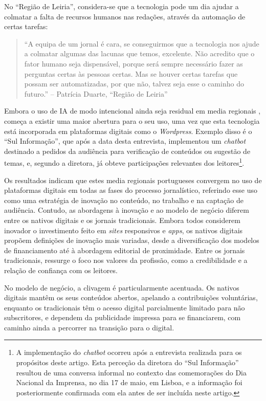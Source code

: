 \documentclass[portuguese]{textolivre}
\begin{document}
No ``Região de Leiria'', considera-se que a tecnologia pode um dia
ajudar a colmatar a falta de recursos humanos nas redações, através da
automação de certas tarefas:

\begin{quote}
``A equipa de um jornal é cara, se conseguirmos que a tecnologia nos
ajude a colmatar algumas das lacunas que temos, excelente. Não acredito
que o fator humano seja dispensável, porque será sempre necessário fazer
as perguntas certas às pessoas certas. Mas se houver certas tarefas que
possam ser automatizadas, por que não, talvez seja esse o caminho do
futuro.'' -- Patrícia Duarte, ``Região de Leiria''
\end{quote}

Embora o uso de IA de modo intencional ainda seja residual em media
regionais \cite{Goncalves2024}, começa a existir uma maior abertura
para o seu uso, uma vez que esta tecnologia está incorporada em
plataformas digitais como o \emph{Wordpress}. Exemplo disso é o ``Sul
Informação'', que após a data desta entrevista, implementou um
\emph{chatbot }destinado a pedidos da audiência para verificação de
conteúdos ou sugestão de temas, e, segundo a diretora, já obteve
participações relevantes dos leitores\footnote{A
  implementação do \emph{chatbot} ocorreu após a entrevista realizada
  para os propósitos deste artigo. Esta perceção da diretora do ``Sul
  Informação'' resultou de uma conversa informal no contexto das
  comemorações do Dia Nacional da Imprensa, no dia 17 de maio, em
  Lisboa, e a informação foi posteriormente confirmada com ela antes de
  ser incluída neste artigo.}.

Os resultados indicam que estes media regionais portugueses convergem no
uso de plataformas digitais em todas as fases do processo jornalístico,
referindo esse uso como uma estratégia de inovação no conteúdo, no
trabalho e na captação de audiência. Contudo, as abordagens à inovação e
ao modelo de negócio diferem entre os nativos digitais e os jornais
tradicionais. Embora todos considerem inovador o investimento feito em
\emph{sites} responsivos e \emph{apps}, os nativos digitais propõem
definições de inovação mais variadas, desde a diversificação dos modelos
de financiamento até à abordagem editorial de proximidade. Entre os
jornais tradicionais, ressurge o foco nos valores da profissão, como a
credibilidade e a relação de confiança com os leitores.

No modelo de negócio, a clivagem é particularmente acentuada. Os nativos
digitais mantêm os seus conteúdos abertos, apelando a contribuições
voluntárias, enquanto os tradicionais têm o acesso digital parcialmente
limitado para não subscritores, e dependem da publicidade impressa para
se financiarem, com caminho ainda a percorrer na transição para o
digital.
\end{document}
